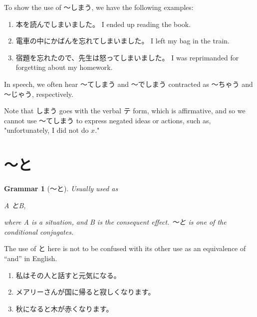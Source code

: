 \documentclass[notoc,notitlepage]{tufte-book}
\newtheorem{grammar}{\faBook Grammar}
\begin{document}
\begin{eg}
  To show the use of 〜しまう, we have the following examples:
  \begin{enumerate}
    \item 本を読んでしまいました。 I ended up reading the book.
    \item 電車の中にかばんを忘れてしまいました。 I left my bag in the train.
    \item 宿題を忘れたので、先生は怒ってしまいました。 I was reprimanded
      for forgetting about my homework.
  \end{enumerate}
\end{eg}

\begin{note}
  In speech, we often hear 〜てしまう and 〜でしまう contracted as
  〜ちゃう and 〜じゃう, respectively.
\end{note}

\begin{warning}
  Note that しまう goes with the verbal テ form,
  which is affirmative, and so we cannot use 〜てしまう
  to express negated ideas or actions, such as, "unfortunately,
  I did not do $x$."
\end{warning}


\section{〜と}%
\label{sec:_to}

\begin{grammar}[〜と]\label{grammar:to}
  Usually used as
  \begin{center}
    A とB,
  \end{center}
  where A is a situation, and B is the consequent effect.
  〜と is one of the conditional conjugates.
\end{grammar}

\begin{note}
  The use of と here is not to be confused with its other use as an equivalence
  of ``and'' in English.
\end{note}

\begin{eg}
  \begin{enumerate}
    \item 私はその人と話すと元気になる。
    \item メアリーさんが国に帰ると寂しくなります。
    \item 秋になると木が赤くなります。
  \end{enumerate}
\end{eg}
\end{document}

